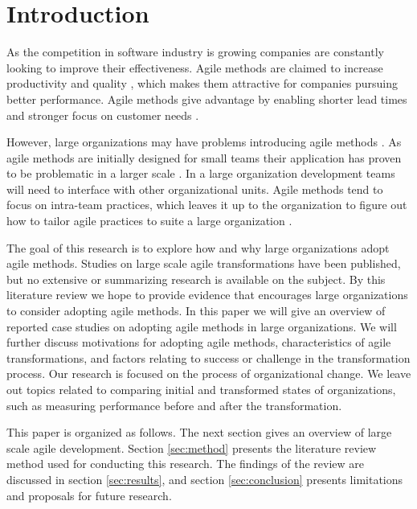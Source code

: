 \documentclass[lnbip]{svmultln}
\begin{document}
\section{Introduction}

As the competition in software industry is growing companies are constantly
looking to improve their effectiveness. Agile methods are claimed to increase
productivity and quality , which makes them attractive
for companies pursuing better performance. Agile methods give advantage by
enabling shorter lead times and stronger focus on customer needs
.

However, large organizations may have problems introducing agile methods
. As agile methods are initially designed for small teams
their application has proven to be problematic in a larger scale
. In a large organization development teams will need to
interface with other organizational units. Agile methods tend to focus on
intra-team practices, which leaves it up to the organization to figure out how to
tailor agile practices to suite a large organization .

The goal of this research is to explore how and why large organizations adopt
agile methods. Studies on large scale agile transformations have been published,
but no extensive or summarizing research is available on the subject.
By this literature review we hope to provide evidence that encourages large
organizations to consider adopting agile methods.
In this paper we will give an overview of reported case studies on adopting
agile methods in large organizations. We will further discuss motivations
for adopting agile methods, characteristics of agile transformations, and
factors relating to success or challenge in the transformation process. Our
research is focused on the process of organizational change. We leave out topics
related to comparing initial and transformed states of organizations, such
as measuring performance before and after the transformation.


This paper is organized as follows. The next section gives an overview of large
scale agile development. Section \ref{sec:method} presents the literature review
method used for conducting this research. The findings of the review are
discussed in section \ref{sec:results}, and section \ref{sec:conclusion}
presents limitations and proposals for future research.


\end{document}
